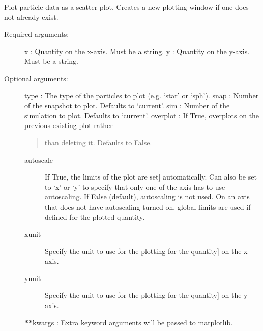 \documentclass[letterpaper,10pt,english]{sphinxmanual}
\begin{document}

\begin{fulllineitems}
\label{index:facade.plot}
Plot particle data as a scatter plot.  Creates a new plotting window if
one does not already exist.
\begin{description}
\item[{Required arguments:}] \leavevmode
x          : Quantity on the x-axis. Must be a string.
y          : Quantity on the y-axis. Must be a string.

\item[{Optional arguments:}] \leavevmode
type       : The type of the particles to plot (e.g. `star' or `sph').
snap       : Number of the snapshot to plot. Defaults to `current'.
sim        : Number of the simulation to plot. Defaults to `current'.
overplot   : If True, overplots on the previous existing plot rather
\begin{quote}

than deleting it. Defaults to False.
\end{quote}
\begin{description}
\item[{autoscale}] \leavevmode{[}If True, the limits of the plot are set{]}
automatically.  Can also be set to `x' or `y' to specify
that only one of the axis has to use autoscaling.
If False (default), autoscaling is not used. On an axis that does
not have autoscaling turned on, global limits are used
if defined for the plotted quantity.

\item[{xunit}] \leavevmode{[}Specify the unit to use for the plotting for the quantity{]}
on the x-axis.

\item[{yunit}] \leavevmode{[}Specify the unit to use for the plotting for the quantity{]}
on the y-axis.

\end{description}

{\color{red}\bfseries{}**}kwargs   : Extra keyword arguments will be passed to matplotlib.

\end{description}

\end{fulllineitems}
\end{document}
